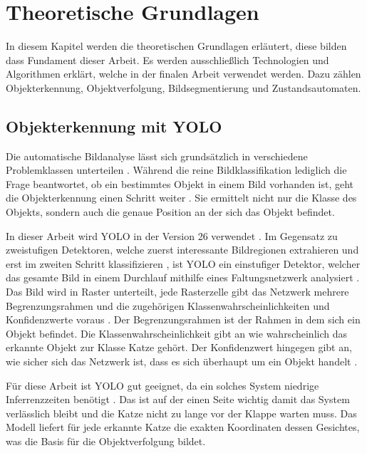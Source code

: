 \chapter{Theoretische Grundlagen}
\label{sec:grundlagen}

In diesem Kapitel werden die theoretischen Grundlagen erläutert, diese bilden dass Fundament dieser Arbeit. Es werden ausschließlich Technologien und Algorithmen erklärt, welche in der finalen Arbeit verwendet werden. Dazu zählen Objekterkennung, Objektverfolgung, Bildsegmentierung und Zustandsautomaten.

\section{Objekterkennung mit YOLO}
\label{subsec:yolo_det}

Die automatische Bildanalyse lässt sich grundsätzlich in verschiedene Problemklassen unterteilen \cite{szeliski2022computer}. Während die reine Bildklassifikation lediglich die Frage beantwortet, ob ein bestimmtes Objekt in einem Bild vorhanden ist, geht die Objekterkennung einen Schritt weiter \cite{zou2023object}. Sie ermittelt nicht nur die Klasse des Objekts, sondern auch die genaue Position an der sich das Objekt befindet. 

In dieser Arbeit wird YOLO \cite{jocher2024yolo} in der Version 26 verwendet \cite{sapkota2025yolo26}. Im Gegensatz zu zweistufigen Detektoren, welche zuerst interessante Bildregionen extrahieren und erst im zweiten Schritt klassifizieren \cite{ren2015faster}, ist YOLO ein einstufiger Detektor, welcher das gesamte Bild in einem Durchlauf mithilfe eines Faltungsnetzwerk \cite{lecun1998gradient, krizhevsky2012imagenet} analysiert \cite{redmon2016yolo}. Das Bild wird in Raster unterteilt, jede Rasterzelle gibt das Netzwerk mehrere Begrenzungsrahmen und die zugehörigen Klassenwahrscheinlichkeiten und Konfidenzwerte voraus \cite{redmon2016yolo}. Der Begrenzungsrahmen ist der Rahmen in dem sich ein Objekt befindet. Die Klassenwahrscheinlichkeit gibt an wie wahrscheinlich das erkannte Objekt zur Klasse Katze gehört. Der Konfidenzwert hingegen gibt an, wie sicher sich das Netzwerk ist, dass es sich überhaupt um ein Objekt handelt \cite{ultralytics_confidence}.

Für diese Arbeit ist YOLO gut geeignet, da ein solches System niedrige Inferrenzzeiten benötigt \cite{terven2023yolo}. Das ist auf der einen Seite wichtig damit das System verlässlich bleibt und die Katze nicht zu lange vor der Klappe warten muss. Das Modell liefert für jede erkannte Katze die exakten Koordinaten dessen Gesichtes, was die Basis für die Objektverfolgung bildet.

